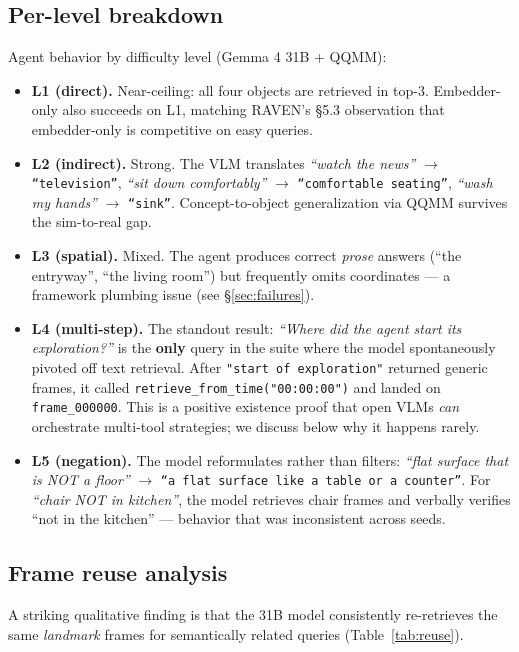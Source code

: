 \documentclass[11pt]{article}
\begin{document}
\subsection{Per-level breakdown}
Agent behavior by difficulty level (Gemma 4 31B + QQMM):
\begin{itemize}[leftmargin=*,itemsep=2pt]
  \item \textbf{L1 (direct).} Near-ceiling: all four objects are retrieved in top-3. Embedder-only also succeeds on L1, matching RAVEN's \S5.3 observation that embedder-only is competitive on easy queries.
  \item \textbf{L2 (indirect).} Strong. The VLM translates \emph{``watch the news''} $\rightarrow$ \texttt{``television''}, \emph{``sit down comfortably''} $\rightarrow$ \texttt{``comfortable seating''}, \emph{``wash my hands''} $\rightarrow$ \texttt{``sink''}. Concept-to-object generalization via QQMM survives the sim-to-real gap.
  \item \textbf{L3 (spatial).} Mixed. The agent produces correct \emph{prose} answers (``the entryway'', ``the living room'') but frequently omits coordinates --- a framework plumbing issue (see \S\ref{sec:failures}).
  \item \textbf{L4 (multi-step).} The standout result: \emph{``Where did the agent start its exploration?''} is the \textbf{only} query in the suite where the model spontaneously pivoted off text retrieval. After \texttt{"start of exploration"} returned generic frames, it called \texttt{retrieve\_from\_time("00:00:00")} and landed on \texttt{frame\_000000}. This is a positive existence proof that open VLMs \emph{can} orchestrate multi-tool strategies; we discuss below why it happens rarely.
  \item \textbf{L5 (negation).} The model reformulates rather than filters: \emph{``flat surface that is NOT a floor''} $\rightarrow$ \texttt{``a flat surface like a table or a counter''}. For \emph{``chair NOT in kitchen''}, the model retrieves chair frames and verbally verifies ``not in the kitchen'' --- behavior that was inconsistent across seeds.
\end{itemize}

\subsection{Frame reuse analysis}
A striking qualitative finding is that the 31B model consistently re-retrieves the same \emph{landmark} frames for semantically related queries (Table~\ref{tab:reuse}).
\end{document}
